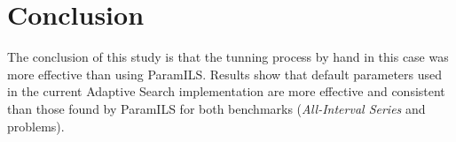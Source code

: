 %
%
%
%
%

\section{Conclusion}

The conclusion of this study is that the tunning process by hand in this case was more effective than using {\sc ParamILS}. Results show that default parameters used in the current Adaptive Search implementation are more effective and consistent than those found by {\sc ParamILS} for both benchmarks ({\it All-Interval Series} and \carr{} problems).